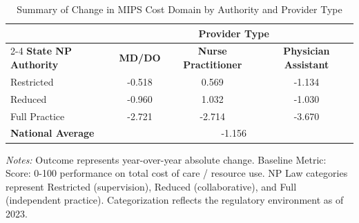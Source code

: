 \begin{table}[htbp]
    \centering
    \caption{Summary of Change in MIPS Cost Domain by Authority and Provider Type}
    \label{tab:d_mips_cost_score_provtype}
    \vspace{0.2cm}
    \begin{tabular}{lccc}
        \toprule
        & \multicolumn{3}{c}{\textbf{Provider Type}} \\
        \cmidrule(lr){2-4}
        \textbf{State NP Authority} & \textbf{MD/DO} & \textbf{Nurse Practitioner} & \textbf{Physician Assistant} \\
        \midrule
        Restricted & -0.518 & 0.569 & -1.134 \\
        Reduced & -0.960 & 1.032 & -1.030 \\
        Full Practice & -2.721 & -2.714 & -3.670 \\
        \midrule
        \textbf{National Average} & \multicolumn{3}{c}{-1.156} \\
        \bottomrule
    \end{tabular}
    \vspace{0.1cm}
    \begin{minipage}{0.85\textwidth}
        \footnotesize \textit{Notes:} Outcome represents year-over-year absolute change. Baseline Metric: Score: 0-100 performance on total cost of care / resource use. NP Law categories represent Restricted (supervision), Reduced (collaborative), and Full (independent practice). Categorization reflects the regulatory environment as of 2023.
    \end{minipage}
\end{table}